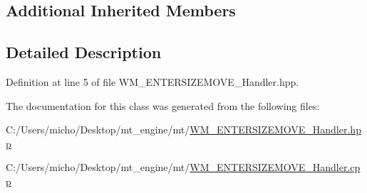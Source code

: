 \subsection*{Additional Inherited Members}


\subsection{Detailed Description}


Definition at line 5 of file W\+M\+\_\+\+E\+N\+T\+E\+R\+S\+I\+Z\+E\+M\+O\+V\+E\+\_\+\+Handler.\+hpp.



The documentation for this class was generated from the following files\+:\begin{DoxyCompactItemize}
\item 
C\+:/\+Users/micho/\+Desktop/mt\+\_\+engine/mt/\hyperlink{_w_m___e_n_t_e_r_s_i_z_e_m_o_v_e___handler_8hpp}{W\+M\+\_\+\+E\+N\+T\+E\+R\+S\+I\+Z\+E\+M\+O\+V\+E\+\_\+\+Handler.\+hpp}\item 
C\+:/\+Users/micho/\+Desktop/mt\+\_\+engine/mt/\hyperlink{_w_m___e_n_t_e_r_s_i_z_e_m_o_v_e___handler_8cpp}{W\+M\+\_\+\+E\+N\+T\+E\+R\+S\+I\+Z\+E\+M\+O\+V\+E\+\_\+\+Handler.\+cpp}\end{DoxyCompactItemize}

